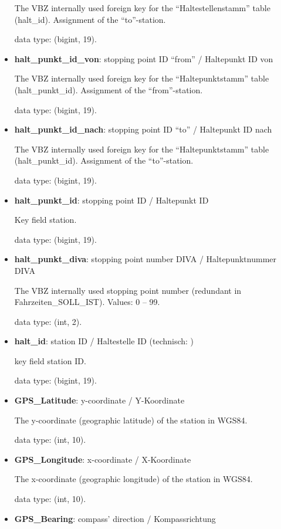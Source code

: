 \documentclass[11pt]{article}
\begin{document}
\begin{itemize}
	The VBZ internally used foreign key for the ``Haltestellenstamm'' table (halt\_id). Assignment of the ``to''-station.
	
	data type: (bigint, 19).
	
	\item \textbf{halt\_punkt\_id\_von}: stopping point ID ``from'' / Haltepunkt ID von
	
	The VBZ internally used foreign key for the ``Haltepunktstamm'' table (halt\_punkt\_id). Assignment of the ``from''-station.
	
	data type: (bigint, 19).
	
	\item \textbf{halt\_punkt\_id\_nach}: stopping point ID ``to'' / Haltepunkt ID nach
	
	The VBZ internally used foreign key for the ``Haltepunktstamm'' table (halt\_punkt\_id). Assignment of the ``to''-station.

	data type: (bigint, 19).
	
	\item \textbf{halt\_punkt\_id}: stopping point ID / Haltepunkt ID
	
	Key field station.
	
	data type: (bigint, 19).
	
	\item \textbf{halt\_punkt\_diva}: stopping point number DIVA / Haltepunktnummer DIVA
	
	The VBZ internally used stopping point number (redundant in Fahrzeiten\_SOLL\_IST). Values: 0 -- 99.
	
	data type: (int, 2).
	
	\item \textbf{halt\_id}: station ID / Haltestelle ID (technisch: )
	
	key field station ID.
	
	data type: (bigint, 19).
	
	\item \textbf{GPS\_Latitude}: y-coordinate / Y-Koordinate
	
	The y-coordinate (geographic latitude) of the station in WGS84.
	
	data type: (int, 10).
	
	\item \textbf{GPS\_Longitude}: x-coordinate / X-Koordinate
	
	The x-coordinate (geographic longitude) of the station in WGS84.
	
	data type: (int, 10).
	
	\item \textbf{GPS\_Bearing}: compass' direction / Kompassrichtung
	

\end{itemize}
\end{document}
